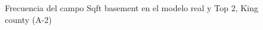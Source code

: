 \begin{figure}[H]
    \centering
    
    \caption{Frecuencia del campo Sqft basement en el modelo real y Top 2, King county (A-2)}
    \label{frecuency-top2-sqft basement}
\end{figure}